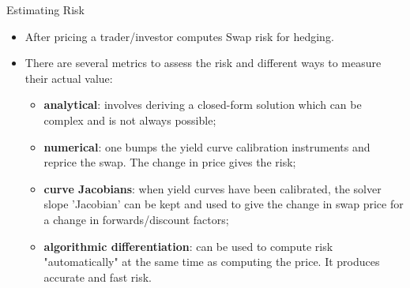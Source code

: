\documentclass{beamer}
\begin{document}
\begin{frame}{Estimating Risk}
\begin{itemize}
\item After pricing a trader/investor computes Swap risk for hedging.
\item There are several metrics to assess the risk and different ways to measure their actual value:
\begin{itemize}
	\item \textbf{analytical}: involves deriving a closed-form solution which can be complex and is not always possible;
	\item \textbf{numerical}: one bumps the yield curve calibration instruments and reprice the swap. The change in price gives the risk;
	\item \textbf{curve Jacobians}: when yield curves have been calibrated, the solver slope 'Jacobian' can be kept and used to give the change in swap price for a change in forwards/discount factors;
	\item \textbf{algorithmic differentiation}: can be used to compute risk "automatically" at the same time as computing the price. It produces accurate and fast risk.
\end{itemize}
\end{itemize}
\end{frame}

\end{document}
